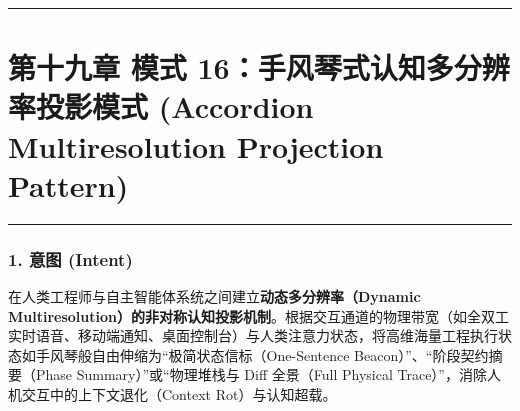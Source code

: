 \documentclass[
]{ctexart}
\newenvironment{Shaded}{}{}
\newcommand{\AttributeTok}[1]{\textcolor[rgb]{0.49,0.56,0.16}{#1}}
\newcommand{\BuiltInTok}[1]{\textcolor[rgb]{0.00,0.50,0.00}{#1}}
\newcommand{\CommentTok}[1]{\textcolor[rgb]{0.38,0.63,0.69}{\textit{#1}}}
\newcommand{\ControlFlowTok}[1]{\textcolor[rgb]{0.00,0.44,0.13}{\textbf{#1}}}
\newcommand{\FunctionTok}[1]{\textcolor[rgb]{0.02,0.16,0.49}{#1}}
\newcommand{\KeywordTok}[1]{\textcolor[rgb]{0.00,0.44,0.13}{\textbf{#1}}}
\newcommand{\NormalTok}[1]{#1}
\newcommand{\OperatorTok}[1]{\textcolor[rgb]{0.40,0.40,0.40}{#1}}
\newcommand{\SpecialCharTok}[1]{\textcolor[rgb]{0.25,0.44,0.63}{#1}}
\newcommand{\StringTok}[1]{\textcolor[rgb]{0.25,0.44,0.63}{#1}}
\newcommand{\VerbatimStringTok}[1]{\textcolor[rgb]{0.25,0.44,0.63}{#1}}
\renewcommand{\_}{\discretionary{}{}{\textunderscore}}
\let\oldsection\section
\renewcommand{\section}{\clearpage\oldsection}
\begin{document}
\begin{Shaded}
\end{Shaded}

\begin{center}\rule{0.5\linewidth}{0.5pt}\end{center}

\section{第十九章 模式 16：手风琴式认知多分辨率投影模式 (Accordion
Multiresolution Projection
Pattern)}\label{ux6a21ux5f0f-16ux624bux98ceux7434ux5f0fux8ba4ux77e5ux591aux5206ux8fa8ux7387ux6295ux5f71ux6a21ux5f0f-accordion-multiresolution-projection-pattern}

\begin{center}\rule{0.5\linewidth}{0.5pt}\end{center}

\subsubsection{1. 意图 (Intent)}\label{ux610fux56fe-intent-15}

在人类工程师与自主智能体系统之间建立\textbf{动态多分辨率（Dynamic
Multiresolution）的非对称认知投影机制}。根据交互通道的物理带宽（如全双工实时语音、移动端通知、桌面控制台）与人类注意力状态，将高维海量工程执行状态如手风琴般自由伸缩为``极简状态信标（One-Sentence
Beacon）''、``阶段契约摘要（Phase Summary）''或``物理堆栈与 Diff
全景（Full Physical Trace）''，消除人机交互中的上下文退化（Context
Rot）与认知超载。
\end{document}
